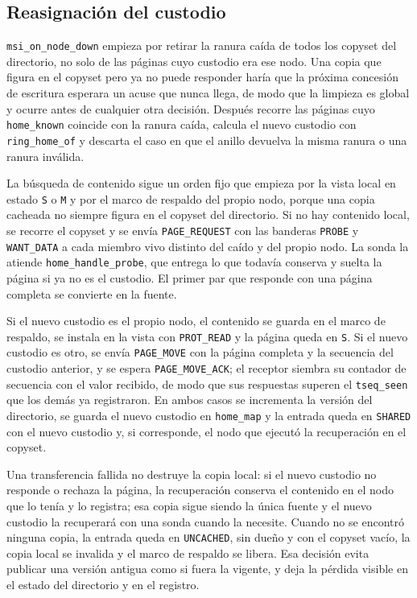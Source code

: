 \subsection{Reasignación del custodio}

\texttt{msi\_on\_node\_down} empieza por retirar la ranura caída de todos los copyset del directorio, no solo de las páginas cuyo custodio era ese nodo. Una copia que figura en el copyset pero ya no puede responder haría que la próxima concesión de escritura esperara un acuse que nunca llega, de modo que la limpieza es global y ocurre antes de cualquier otra decisión. Después recorre las páginas cuyo \texttt{home\_known} coincide con la ranura caída, calcula el nuevo custodio con \texttt{ring\_home\_of} y descarta el caso en que el anillo devuelva la misma ranura o una ranura inválida.

La búsqueda de contenido sigue un orden fijo que empieza por la vista local en estado \texttt{S} o \texttt{M} y por el marco de respaldo del propio nodo, porque una copia cacheada no siempre figura en el copyset del directorio. Si no hay contenido local, se recorre el copyset y se envía \texttt{PAGE\_REQUEST} con las banderas \texttt{PROBE} y \texttt{WANT\_DATA} a cada miembro vivo distinto del caído y del propio nodo. La sonda la atiende \texttt{home\_handle\_probe}, que entrega lo que todavía conserva y suelta la página si ya no es el custodio. El primer par que responde con una página completa se convierte en la fuente.

Si el nuevo custodio es el propio nodo, el contenido se guarda en el marco de respaldo, se instala en la vista con \texttt{PROT\_READ} y la página queda en \texttt{S}. Si el nuevo custodio es otro, se envía \texttt{PAGE\_MOVE} con la página completa y la secuencia del custodio anterior, y se espera \texttt{PAGE\_MOVE\_ACK}; el receptor siembra su contador de secuencia con el valor recibido, de modo que sus respuestas superen el \texttt{tseq\_seen} que los demás ya registraron. En ambos casos se incrementa la versión del directorio, se guarda el nuevo custodio en \texttt{home\_map} y la entrada queda en \texttt{SHARED} con el nuevo custodio y, si corresponde, el nodo que ejecutó la recuperación en el copyset.

Una transferencia fallida no destruye la copia local: si el nuevo custodio no responde o rechaza la página, la recuperación conserva el contenido en el nodo que lo tenía y lo registra; esa copia sigue siendo la única fuente y el nuevo custodio la recuperará con una sonda cuando la necesite. Cuando no se encontró ninguna copia, la entrada queda en \texttt{UNCACHED}, sin dueño y con el copyset vacío, la copia local se invalida y el marco de respaldo se libera. Esa decisión evita publicar una versión antigua como si fuera la vigente, y deja la pérdida visible en el estado del directorio y en el registro.


